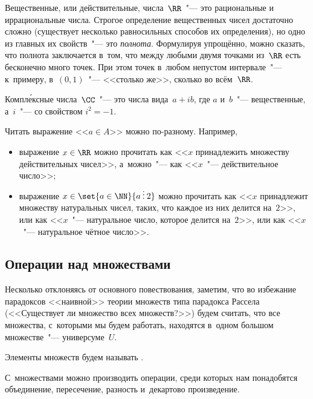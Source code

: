 \begin{example}
	Вещественные, или действительные, числа~$\RR$~"--- это рациональные и
	иррациональные числа. Строгое определение вещественных чисел достаточно
	сложно (существует несколько равносильных способов их определения), но одно
	из главных их свойств~"--- это \emph{полнота}. Формулируя упрощённо, можно
	сказать, что полнота заключается в~том, что между любыми двумя точками
	из~$\RR$ есть бесконечно много точек. При этом точек в~любом непустом
	интервале~"--- к~примеру, в~$(0, 1)$~"--- <<столько же>>, сколько во
	всём~$\RR$.
\end{example}

\begin{example}
	Компл\'{е}ксные числа~$\CC$~"--- это числа вида~$a + ib$, где $a$ и~$b$~"---
	вещественные, а~$i$~"---  со свойством $i^2 = -1$.
\end{example}

\begin{example}
	Читать выражение <<$a \in A$>> можно по-разному.
	Например,
	\begin{itemize}
		\item выражение $x \in \RR$ можно прочитать как <<$x$ принадлежить
			множеству действительных чисел>>, а~можно~"--- как <<$x$~"---
			действительное число>>; 
		\item выражение $x \in \set{a \in \NN}{a \mathbin{\smash{\vdots}} 2}$ можно
			прочитать как <<$x$ принадлежит множеству натуральных чисел, таких, что
			каждое из них делится на~$2$>>, или как <<$x$~"--- натуральное число,
			которое делится на~$2$>>, или как <<$x$~"--- натуральное чётное число>>.
	\end{itemize}
\end{example}

\subsection{Операции над множествами}

Несколько отклоняясь от основного повествования, заметим, что во избежание парадоксов <<наивной>> теории множеств типа парадокса Рассела (<<Существует ли множество всех множеств?>>) будем считать, что все множества, с~которыми мы будем работать, находятся в~одном большом множестве~"--- универсуме~$U$.

Элементы множеств будем называть .

С~множествами можно производить операции, среди которых нам понадобятся объединение, пересечение, разность и~декартово произведение.

